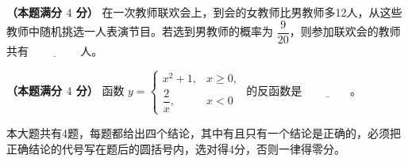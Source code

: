 \begin{question}
\textbf{（本题满分 $4$ 分）} 在一次教师联欢会上，到会的女教师比男教师多12人，从这些教师中随机挑选一人表演节目。若选到男教师的概率为 $\dfrac9{20}$，则参加联欢会的教师共有 $\underline{\qquad\qquad}$ 人。

\end{question}
\begin{question}
\textbf{（本题满分 $4$ 分）} 函数 $y=\begin{cases}x^2+1,&x\geq0,\\ \dfrac2x,&x<0\end{cases}$ 的反函数是 $\underline{\qquad\qquad}$。

\end{question}

本大题共有4题，每题都给出四个结论，其中有且只有一个结论是正确的，必须把正确结论的代号写在题后的圆括号内，选对得4分，否则一律得零分。

